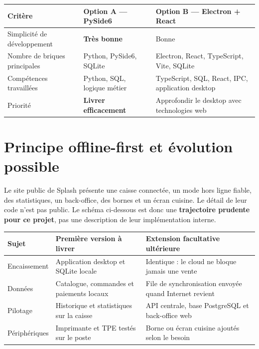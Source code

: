 \documentclass[11pt,a4paper]{article}
\begin{document}
\begin{tabularx}{\textwidth}{L{4.25cm} Y Y}
  \toprule
  \color{white}\textbf{Critère} &
  \color{white}\textbf{Option A --- PySide6} &
  \color{white}\textbf{Option B --- Electron + React} \\
  \midrule
  Simplicité de développement &
  \textbf{Très bonne} &
  Bonne \\
  Nombre de briques principales &
  Python, PySide6, SQLite &
  Electron, React, TypeScript, Vite, SQLite \\
  Compétences travaillées &
  Python, SQL, logique métier &
  TypeScript, SQL, React, IPC, application desktop \\
  Priorité &
  \textbf{Livrer efficacement} &
  Approfondir le desktop avec technologies web \\
  \bottomrule
\end{tabularx}

\section{Principe offline-first et évolution possible}

Le site public de Splash présente une caisse connectée, un mode hors ligne fiable, des statistiques,
un back-office, des bornes et un écran cuisine. Le détail de leur code n'est pas public. Le schéma
ci-dessous est donc une \textbf{trajectoire prudente pour ce projet}, pas une description de leur
implémentation interne.

\begin{tabularx}{\textwidth}{L{4.1cm} Y Y}
  \toprule
  \color{white}\textbf{Sujet} &
  \color{white}\textbf{Première version à livrer} &
  \color{white}\textbf{Extension facultative ultérieure} \\
  \midrule
  Encaissement &
  Application desktop et SQLite locale &
  Identique : le cloud ne bloque jamais une vente \\
  Données &
  Catalogue, commandes et paiements locaux &
  File de synchronisation envoyée quand Internet revient \\
  Pilotage &
  Historique et statistiques sur la caisse &
  API centrale, base PostgreSQL et back-office web \\
  Périphériques &
  Imprimante et TPE testés sur le poste &
  Borne ou écran cuisine ajoutés selon le besoin \\
  \bottomrule
\end{tabularx}
\end{document}
